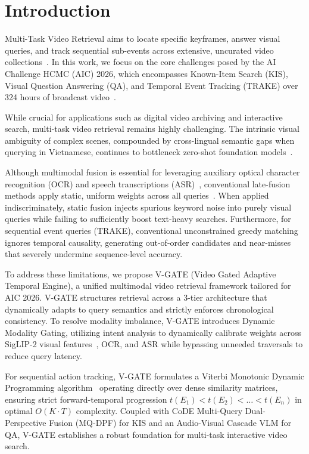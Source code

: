 \documentclass[runningheads]{llncs}
\begin{document}
\section{Introduction}
Multi-Task Video Retrieval aims to locate specific keyframes, answer visual queries, and track sequential sub-events across extensive, uncurated video collections~\cite{lokoc2021is,do2023news}. In this work, we focus on the core challenges posed by the AI Challenge HCMC (AIC) 2026, which encompasses Known-Item Search (KIS), Visual Question Answering (QA), and Temporal Event Tracking (TRAKE) over 324 hours of broadcast video~\cite{do2025toward}.

While crucial for applications such as digital video archiving and interactive search, multi-task video retrieval remains highly challenging. The intrinsic visual ambiguity of complex scenes, compounded by cross-lingual semantic gaps when querying in Vietnamese, continues to bottleneck zero-shot foundation models~\cite{radford2021learning,zhai2023sigmoid}.

Although multimodal fusion is essential for leveraging auxiliary optical character recognition (OCR) and speech transcriptions (ASR)~\cite{radford2023robust,du2020ppocr}, conventional late-fusion methods apply static, uniform weights across all queries~\cite{le2025cese,dinh2024transforming}. When applied indiscriminately, static fusion injects spurious keyword noise into purely visual queries while failing to sufficiently boost text-heavy searches. Furthermore, for sequential event queries (TRAKE), conventional unconstrained greedy matching ignores temporal causality, generating out-of-order candidates and near-misses that severely undermine sequence-level accuracy.

To address these limitations, we propose V-GATE (Video Gated Adaptive Temporal Engine), a unified multimodal video retrieval framework tailored for AIC 2026. V-GATE structures retrieval across a 3-tier architecture that dynamically adapts to query semantics and strictly enforces chronological consistency. To resolve modality imbalance, V-GATE introduces Dynamic Modality Gating, utilizing intent analysis to dynamically calibrate weights across SigLIP-2 visual features~\cite{tschannen2025siglip2}, OCR, and ASR while bypassing unneeded traversals to reduce query latency.

For sequential action tracking, V-GATE formulates a Viterbi Monotonic Dynamic Programming algorithm~\cite{viterbi1967error} operating directly over dense similarity matrices, ensuring strict forward-temporal progression $t(E_1) < t(E_2) < \dots < t(E_n)$ in optimal $O(K \cdot T)$ complexity. Coupled with CoDE Multi-Query Dual-Perspective Fusion (MQ-DPF) for KIS and an Audio-Visual Cascade VLM for QA, V-GATE establishes a robust foundation for multi-task interactive video search.
\end{document}
